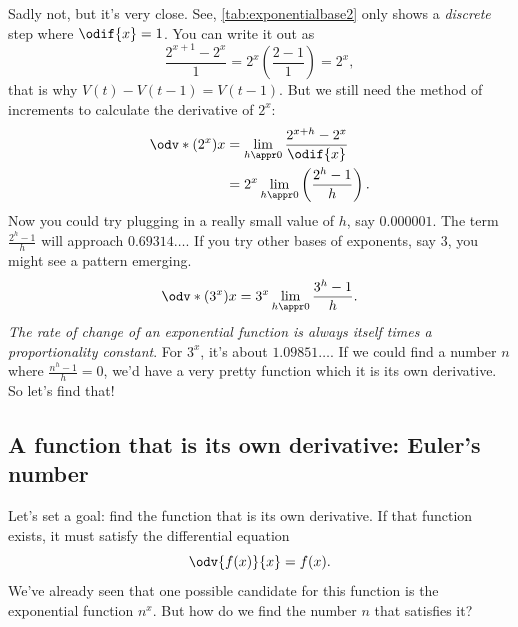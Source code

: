 Sadly not, but it's very close. See, \cref{tab:exponentialbase2} only shows a \emph{discrete} step where $\odif{x} = 1$. You can write it out as
\begin{equation}
	\frac{2^{x + 1} - 2^x}{1} = 2^x\left(\frac{2 - 1}{1}\right) = 2^x,
\end{equation}
that is why $V(t) - V(t - 1) = V(t - 1)$. But we still need the method of increments to calculate the derivative of $2^x$:
\begin{align*}
	\odv*{(2^x)}{x} & = \lim_{h \appr 0}\frac{2^{x + h} - 2^x}{\odif{x}}    \\
	                & = 2^x\lim_{h \appr 0}\left(\frac{2^h - 1}{h}\right).
\end{align*}
Now you could try plugging in a really small value of $h$, say $0.000001$. The term $\frac{2^h - 1}{h}$ will approach $0.69314\dots$. If you try other bases of exponents, say $3$, you might see a pattern emerging.
\begin{equation}
	\odv*{(3^x)}{x} = 3^x\lim_{h \appr 0}\frac{3^h - 1}{h}.
\end{equation}
\emph{The rate of change of an exponential function is always itself times a proportionality constant}. For $3^x$, it's about $1.09851\dots$. If we could find a number $n$ where $\frac{n^h - 1}{h} = 0$, we'd have a very pretty function which it is its own derivative. So let's find that!

\subsection{A function that is its own derivative: Euler's number}
\label{sec:function_equals_own_derivative}

Let's set a goal: find the function that is its own derivative. If that function exists, it must satisfy the differential equation
\begin{equation}
	\odv{f(x)}{x} = f(x). \label{eq:ex-differential-equation}
\end{equation}
We've already seen that one possible candidate for this function is the exponential function $n^x$. But how do we find the number $n$ that satisfies it?

